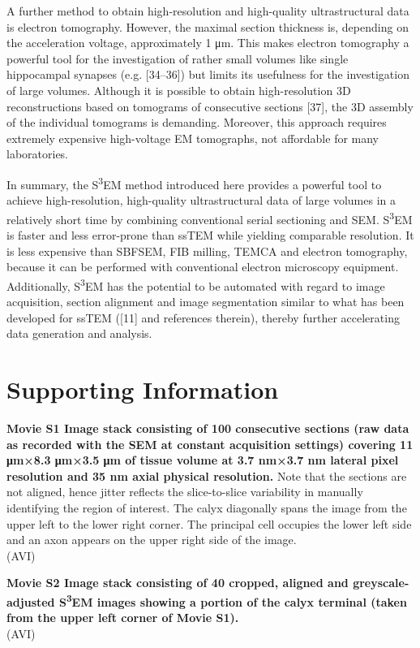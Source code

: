 \documentclass{article}
\begin{document}
A further method to obtain high-resolution and high-quality ultrastructural data is electron tomography. However, the maximal section thickness is, depending on the acceleration voltage, approximately 1 μm. This makes electron tomography a powerful tool for the investigation of rather small volumes like single hippocampal synapses (e.g. [34–36]) but limits its usefulness for the investigation of large volumes. Although it is possible to obtain high-resolution 3D reconstructions based on tomograms of consecutive sections [37], the 3D assembly of the individual tomograms is demanding. Moreover, this approach requires extremely expensive high-voltage EM tomographs, not affordable for many laboratories.

In summary, the S\textsuperscript{3}EM method introduced here provides a powerful tool to achieve high-resolution, high-quality ultrastructural data of large volumes in a relatively short time by combining conventional serial sectioning and SEM. S\textsuperscript{3}EM is faster and less error-prone than ssTEM while yielding comparable resolution. It is less expensive than SBFSEM, FIB milling, TEMCA and electron tomography, because it can be performed with conventional electron microscopy equipment. Additionally, S\textsuperscript{3}EM has the potential to be automated with regard to image acquisition, section alignment and image segmentation similar to what has been developed for ssTEM ([11] and references therein), thereby further accelerating data generation and analysis.

\section*{Supporting Information}

\noindent\textbf{Movie S1 Image stack consisting of 100 consecutive sections (raw data as recorded with the SEM at constant acquisition settings) covering 11 μm×8.3 μm×3.5 μm of tissue volume at 3.7 nm×3.7 nm lateral pixel resolution and 35 nm axial physical resolution.} Note that the sections are not aligned, hence jitter reflects the slice-to-slice variability in manually identifying the region of interest. The calyx diagonally spans the image from the upper left to the lower right corner. The principal cell occupies the lower left side and an axon appears on the upper right side of the image.\\
(AVI)

\noindent\textbf{Movie S2 Image stack consisting of 40 cropped, aligned and greyscale-adjusted S\textsuperscript{3}EM images showing a portion of the calyx terminal (taken from the upper left corner of Movie S1).}\\
(AVI)
\end{document}

